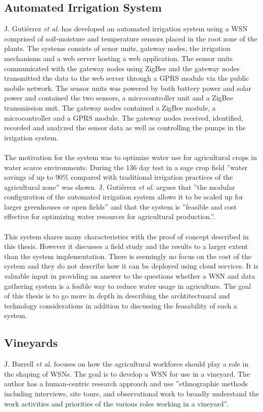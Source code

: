 \documentclass[]{uiophd}
\begin{document}
\subsection{Automated Irrigation System}
J. Gutiérrez \textit{et al}. \cite{6582678} has developed an automated irrigation system using a WSN comprised of soil-moisture and temperature sensors placed in the root zone of the plants. The systems consists of senor units, gateway nodes, the irrigation mechanisms and a web server hosting a web application. The sensor units communicated with the gateway nodes using ZigBee and the gateway nodes transmitted the data to the web server through a GPRS module via the public mobile network. The sensor units was powered by both battery power and solar power and contained the two sensors, a microcontroller unit and a ZigBee transmission unit. The gateway nodes contained a ZigBee module, a microcontroller and a GPRS module. The gateway nodes received, identified, recorded and analyzed the sensor data as well as controlling the pumps in the irrigation system.
\\\\
The motivation for the system was to optimize water use for agricultural crops in water scarce environments. During the 136 day test in a sage crop field ''water savings of up to 90\% compared with traditional irrigation practices of the agricultural zone''\cite[p.~174]{6582678} was shown. J. Gutiérrez \textit{et al}. argues that ''the modular configuration of the automated irrigation system allows it to be scaled up for larger greenhouses or open fields''\cite[p.~166]{6582678} and that the system is ''feasible and cost effective for optimizing water resources for agricultural production.''\cite[p.~174]{6582678}.
\\\\
This system shares many characteristics with the proof of concept described in this thesis. However it discusses a field study and the results to a larger extent than the system implementation. There is seemingly no focus on the cost of the system and they do not describe how it can be deployed using cloud services. It is valuable input in providing an answer to the questions whether a WSN and data gathering system is a fesible way to reduce water usage in agriculture. The goal of this thesis is to go more in depth in describing the archtitectuaral and technology considerations in addition to discussing the feasability of such a system.  

\subsection{Vineyards}
J. Burrell \textit{et al}.\cite{1269130} focuses on how the agricultural workforce should play a role in the shaping of WSNs. The goal is to develop a WSN for use in a vineyard. The author has a human-centric research approach and use ''ethnographic methods including interviews, site tours, and observational work to broadly understand the work activities and priorities of the various roles working in a vineyard''\cite[p.~38]{1269130}.
\end{document}
